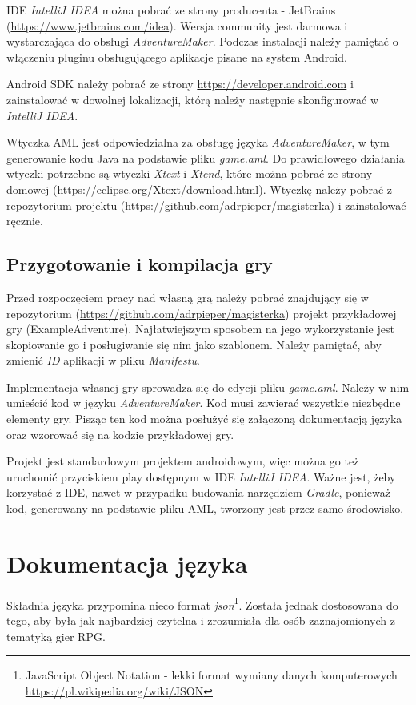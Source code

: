 \documentclass[openright]{xmgr}
\begin{document}
IDE \textit{IntelliJ IDEA} można pobrać ze strony producenta - JetBrains (\url{https://www.jetbrains.com/idea}). Wersja community jest darmowa i wystarczająca do obsługi \textit{AdventureMaker}. Podczas instalacji należy pamiętać o włączeniu pluginu obsługującego aplikacje pisane na system Android.

Android SDK  należy pobrać ze strony \url{https://developer.android.com} i zainstalować w dowolnej lokalizacji, którą należy następnie skonfigurować w \textit{IntelliJ IDEA}.

Wtyczka AML jest odpowiedzialna za obsługę języka \textit{AdventureMaker}, w tym generowanie kodu Java na podstawie pliku \textit{game.aml}. Do prawidłowego działania wtyczki potrzebne są wtyczki \textit{Xtext} i \textit{Xtend}, które można pobrać ze strony domowej (\url{https://eclipse.org/Xtext/download.html}).
Wtyczkę należy pobrać z repozytorium projektu (\url{https://github.com/adrpieper/magisterka}) i zainstalować ręcznie.

\section{Przygotowanie i kompilacja gry}
Przed rozpoczęciem pracy nad własną grą należy pobrać znajdujący się w repozytorium (\url{https://github.com/adrpieper/magisterka}) projekt przykładowej gry (ExampleAdventure). Najłatwiejszym sposobem na jego wykorzystanie jest skopiowanie go i posługiwanie się nim jako szablonem. Należy pamiętać, aby zmienić \textit{ID} aplikacji w pliku \textit{Manifestu}.

Implementacja własnej gry sprowadza się do edycji pliku \textit{game.aml}. Należy w nim umieścić kod w języku \textit{AdventureMaker}. Kod musi  zawierać wszystkie niezbędne elementy gry. Pisząc ten kod można posłużyć się załączoną dokumentacją języka oraz wzorować się na kodzie przykładowej gry.

Projekt jest standardowym projektem androidowym, więc można go też uruchomić przyciskiem play dostępnym w IDE \textit{IntelliJ IDEA}. Ważne jest, żeby korzystać z IDE, nawet w przypadku budowania narzędziem \textit{Gradle}, ponieważ kod, generowany na podstawie pliku AML, tworzony jest przez samo środowisko.

\chapter{Dokumentacja języka} 

Składnia języka przypomina nieco format \textit{json}\footnote{JavaScript Object Notation - lekki format wymiany danych komputerowych \url{https://pl.wikipedia.org/wiki/JSON}}. Została jednak dostosowana do tego, aby była jak najbardziej czytelna i zrozumiała dla osób zaznajomionych z tematyką gier RPG.
\end{document}
